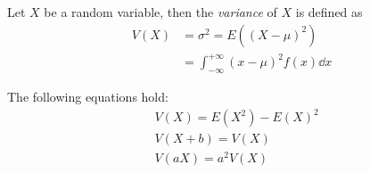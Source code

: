 \documentclass[12pt]{extarticle}
\begin{document}
\begin{definition}[variance]
    Let $X$ be a random variable, then the \emph{variance} of $X$ is defined as
    \begin{align}
        V(X) & = \sigma^2 = E((X - \mu)^2)                        \\
             & = \int_{-\infty}^{+\infty} (x - \mu)^2 f(x) \dd{x}
    \end{align}
\end{definition}

\begin{theorem}
    The following equations hold:
    \begin{align}
         & V(X) = E(X^2) - E(X)^2 \label{eq:prop_variance:1} \\
         & V(X + b) = V(X)        \label{eq:prop_variance:2} \\
         & V(aX) = a^2 V(X) \label{eq:prop_variance:3}
    \end{align}
\end{theorem}
\end{document}
